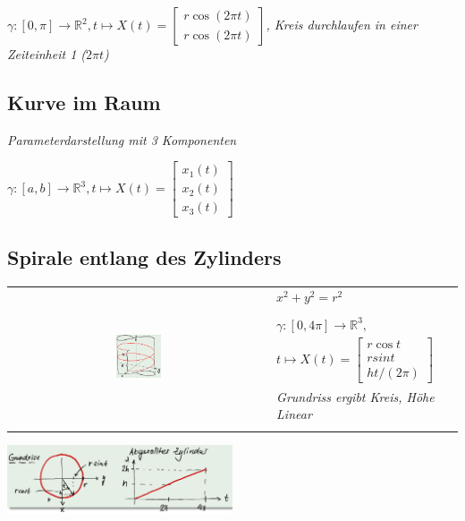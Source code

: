 \textit{$\gamma : [0,\pi] \rightarrow \mathbb{R}^2,t \mapsto X(t) =
\begin{bmatrix}
    r \cos(2\pi t) \\ r \cos(2\pi t)
\end{bmatrix}$, Kreis durchlaufen in einer Zeiteinheit 1 ($2\pi t$)}

\subsection{Kurve im Raum}
\textit{Parameterdarstellung mit 3 Komponenten}

$\gamma : [a,b] \rightarrow \mathbb{R}^3,t \mapsto X(t) =
\begin{bmatrix}
    x_1(t) \\
    x_2(t) \\
    x_3(t)
\end{bmatrix}$

\subsection{Spirale entlang des Zylinders}


\begin{tabular}{cl}
    \multirow{8}{*}{
        \includegraphics[width=0.18\textwidth]{assets/curves-spiral-following-cylinder.png}
    } & $x^2 + y^2 = r^2$ \\
    & \\
    & $\gamma : [0, 4\pi] \rightarrow \mathbb{R}^3,$ \\
    & $t \mapsto X(t) = \begin{bmatrix}
        r \cos t \\ r sin t \\ ht / (2\pi)
    \end{bmatrix}$ \\
    & \textit{Grundriss ergibt Kreis, Höhe Linear} \\
    & \\
\end{tabular}

\includegraphics[width=0.5\textwidth]{assets/curves-spiral-following-cylinder-sol.png}

